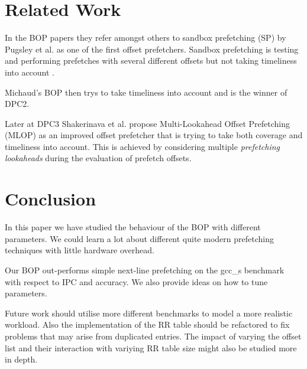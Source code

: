 \documentclass[conference]{IEEEtran}
\begin{document}

\section{Related Work} %

In the BOP papers they refer amongst others to sandbox prefetching (SP) by Pugsley et al. \cite{Pugsley2014SandboxPS} as one of the first offset prefetchers.
Sandbox prefetching is testing and performing prefetches with several different offsets but not taking timeliness into account \cite[section 4]{BOP_2015}.

Michaud's BOP then trys to take timeliness into account and is the winner of DPC2.

Later at DPC3 Shakerinava et al. propose Multi-Lookahead Offset Prefetching (MLOP)\cite{Multi-Lookahead} as an improved offset prefetcher that is trying
to take both coverage and timeliness into account. This is achieved by considering multiple \textit{prefetching lookaheads} during the evaluation of prefetch offsets.




\section{Conclusion}


In this paper we have studied the behaviour of the BOP with different parameters.
We could learn a lot about different quite modern prefetching techniques with little hardware overhead.

Our BOP out-performs simple next-line prefetching on the gcc\_s benchmark with respect to IPC and accuracy.
We also provide ideas on how to tune parameters.

Future work should utilise more different benchmarks to model a more realistic workload.
Also the implementation of the RR table should be refactored to fix problems that may arise from duplicated entries.
The impact of varying the offset list and their interaction with variying RR table size might also be studied more in depth.
\end{document}
